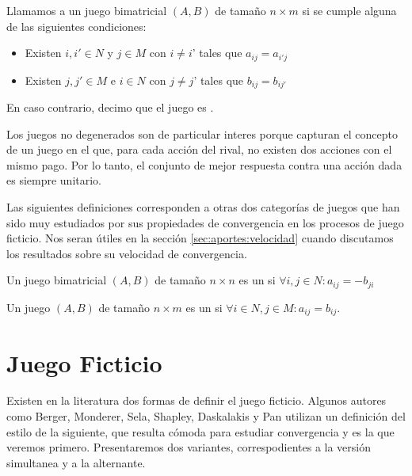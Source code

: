 \begin{definition}
    Llamamos  a un juego bimatricial $(A, B)$ de tamaño $n \times m$ si se cumple alguna de las siguientes condiciones:
    \begin{itemize}
        \item Existen $i, i' \in N$ y $j \in M$ con $i \neq i$' tales que $a_{ij} = a_{i'j}$
        \item Existen $j, j' \in M$ e $i \in N$ con $j \neq j$' tales que $b_{ij} = b_{ij'}$
    \end{itemize}
    En caso contrario, decimo que el juego es .
\end{definition}
Los juegos no degenerados son de particular interes porque capturan el concepto de un juego en el que, para cada acción del rival, no existen dos acciones con el mismo pago. Por lo tanto, el conjunto de mejor respuesta contra una acción dada es siempre unitario.

Las siguientes definiciones corresponden a otras dos categorías de juegos que han sido muy estudiados por sus propiedades de convergencia en los procesos de juego ficticio. Nos seran útiles en la sección \ref{sec:aportes:velocidad} cuando discutamos los resultados sobre su velocidad de convergencia. 

\begin{definition}
    Un juego bimatricial $(A, B)$ de tamaño $n \times n$ es un  si $\forall i, j \in N : a_{ij} = -b_{ji}$
\end{definition}

\begin{definition}
    Un juego $(A, B)$ de tamaño $n \times m$ es un  si $\forall i \in N, j \in M : a_{ij} = b_{ij}$.
\end{definition}


\section{Juego Ficticio} \label{sec:def:fp}


Existen en la literatura dos formas de definir el juego ficticio. Algunos autores como Berger, Monderer, Sela, Shapley, Daskalakis y Pan \cite{browns:original} \cite{no:cycling} \cite{2x2:without} \cite{identical:interests} \cite{counter:karlin:strong} utilizan un definición del estilo de la siguiente, que resulta cómoda para estudiar convergencia y es la que veremos primero. Presentaremos dos variantes, correspodientes a la versión simultanea y a la alternante.


